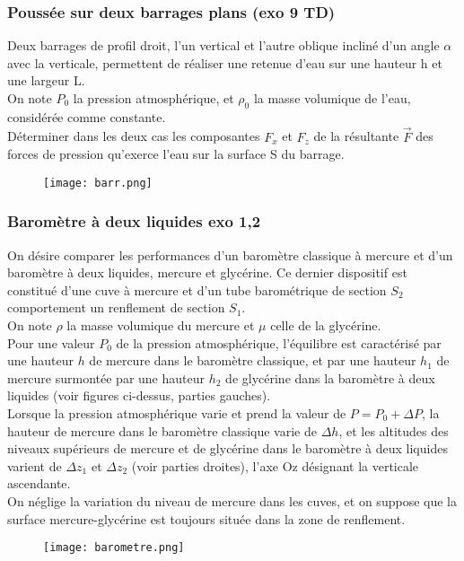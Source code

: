 \documentclass[a4paper,12pt]{article}
\newcommand\bk{\color{black}}
\newcommand\navy{\color{navy}}
\begin{document}
\navy \subsubsection*{Poussée sur deux barrages plans (exo 9 TD)} \bk
Deux barrages de profil droit, l'un vertical et l'autre oblique incliné d'un angle $\alpha$ avec la verticale, permettent de réaliser une retenue d'eau sur une hauteur h et une largeur L.\\[2mm]
On note $P_0$ la pression atmosphérique, et $\rho_0$ la masse volumique de l'eau, considérée comme constante.\\

Déterminer dans les deux cas les composantes $F_x$ et $F_z$ de la résultante $\vec{F}$ des forces de pression qu'exerce l'eau sur la surface S du barrage.

\begin{figure}[!ht]
\centering
\texttt{[image: barr.png]}
\end{figure}

\pagebreak

\navy \subsubsection*{Baromètre à deux liquides exo 1,2} \bk
On désire comparer les performances d'un baromètre classique à mercure et d'un baromètre à deux liquides, mercure et glycérine. Ce dernier dispositif est constitué d'une cuve à mercure et d'un tube barométrique de section $S_2$ comportement un renflement de section $S_1$.\\
On note $\rho$ la masse volumique du mercure et $\mu$ celle de la glycérine.\\

Pour une valeur $P_0$ de la pression atmosphérique, l'équilibre est caractérisé par une hauteur $h$ de mercure dans le baromètre classique, et par une hauteur $h_1$ de mercure surmontée par une hauteur $h_2$ de glycérine dans la baromètre à deux liquides (voir figures ci-dessus, parties gauches).\\
Lorsque la pression atmosphérique varie et prend la valeur de $P = P_0 + \Delta P$, la hauteur de mercure dans le baromètre classique varie de $\Delta h$, et les altitudes des niveaux supérieurs de mercure et de glycérine dans le baromètre à deux liquides varient de $\Delta z_1$ et $\Delta z_2$ (voir parties droites), l'axe Oz désignant la verticale ascendante.\\
On néglige la variation du niveau de mercure dans les cuves, et on suppose que la surface mercure-glycérine est toujours située dans la zone de renflement.
\begin{figure}[!ht]
\centering
\texttt{[image: barometre.png]}
\end{figure}
\end{document}
